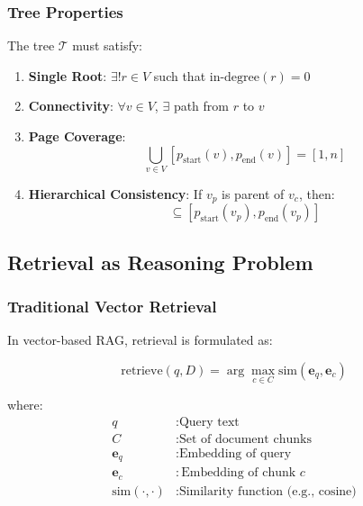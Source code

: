 \documentclass[12pt,a4paper]{article}
\begin{document}
\subsubsection{Tree Properties}

The tree $\mathcal{T}$ must satisfy:

\begin{enumerate}
    \item \textbf{Single Root}: $\exists! r \in V$ such that $\text{in-degree}(r) = 0$
    
    \item \textbf{Connectivity}: $\forall v \in V$, $\exists$ path from $r$ to $v$
    
    \item \textbf{Page Coverage}: 
    \begin{equation}
    \bigcup_{v \in V} [p_{\text{start}}(v), p_{\text{end}}(v)] = [1, n]
    \end{equation}
    
    \item \textbf{Hierarchical Consistency}:
    If $v_p$ is parent of $v_c$, then:
    \begin{equation}
    [p_{\text{start}}(v_c), p_{\text{end}}(v_c)] \subseteq [p_{\text{start}}(v_p), p_{\text{end}}(v_p)]
    \end{equation}
\end{enumerate}

\subsection{Retrieval as Reasoning Problem}

\subsubsection{Traditional Vector Retrieval}

In vector-based RAG, retrieval is formulated as:

\begin{equation}
\text{retrieve}(q, D) = \arg\max_{c \in C} \text{sim}(\mathbf{e}_q, \mathbf{e}_c)
\end{equation}

where:
\begin{align*}
q &: \text{Query text} \\
C &: \text{Set of document chunks} \\
\mathbf{e}_q &: \text{Embedding of query} \\
\mathbf{e}_c &: \text{Embedding of chunk } c \\
\text{sim}(\cdot, \cdot) &: \text{Similarity function (e.g., cosine)}
\end{align*}
\end{document}
